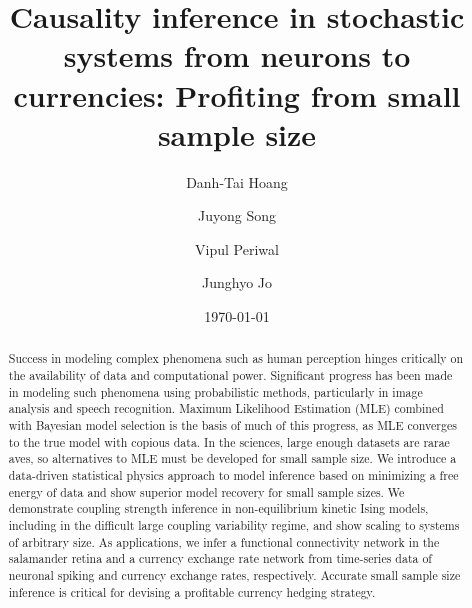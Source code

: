 \documentclass[prx,twocolumn,twoside,showpacs,superscriptaddress]{revtex4-1}
\begin{document}
\title{Causality inference in stochastic systems from neurons to currencies: Profiting from small sample size}

\author{Danh-Tai Hoang}%

\author{Juyong Song}

\author{Vipul Periwal}

\author{Junghyo Jo}


\date{\today}

\begin{abstract}
Success in modeling complex phenomena such as human perception hinges critically on the availability of data and computational power.  Significant progress has been made in modeling  such phenomena using probabilistic methods, particularly in image analysis and speech recognition.
Maximum Likelihood Estimation (MLE) combined with Bayesian model selection is the basis of much of this progress, as MLE converges to the true model with copious data. In the sciences, large enough datasets are rarae aves, so alternatives to MLE must be developed for small sample size. We introduce a data-driven statistical physics approach to model inference based on minimizing a free energy of data and show superior model recovery for small sample sizes. We demonstrate coupling strength inference in non-equilibrium kinetic Ising models, including in the difficult large coupling variability regime, and show scaling to systems of arbitrary size.
As applications, we infer a functional connectivity network in the salamander retina and a currency exchange rate network from time-series data of neuronal spiking and currency exchange rates, respectively. Accurate small sample size inference is critical for devising a profitable currency hedging strategy.
\end{abstract}
\end{document}
